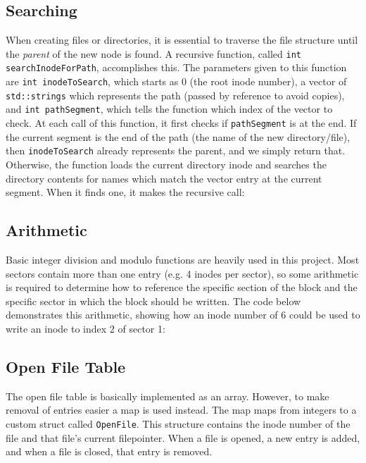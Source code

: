 \documentclass[]{article}
\begin{document}
\subsection{Searching}
When creating files or directories, it is essential to traverse the file structure until the \emph{parent} of the new node is found. A recursive function, called \texttt{int searchInodeForPath}, accomplishes this. The parameters given to this function are \texttt{int inodeToSearch}, which starts as 0 (the root inode number), a vector of \texttt{std::strings} which represents the path (passed by reference to avoid copies), and \texttt{int pathSegment}, which tells the function which index of the vector to check. At each call of this function, it first checks if \texttt{pathSegment} is at the end. If the current segment is the end of the path (the name of the new directory/file), then \texttt{inodeToSearch} already represents the parent, and we simply return that. Otherwise, the function loads the current directory inode and searches the directory contents for names which match the vector entry at the current segment. When it finds one, it makes the recursive call:


\subsection{Arithmetic}
Basic integer division and modulo functions are heavily used in this project. Most sectors contain more than one entry (e.g. 4 inodes per sector), so some arithmetic is required to determine how to reference the specific section of the block and the specific sector in which the block should be written. The code below demonstrates this arithmetic, showing how an inode number of 6 could be used to write an inode to index 2 of sector 1:


\subsection{Open File Table}
The open file table is basically implemented as an array. However, to make removal of entries easier a map is used instead. The map maps from integers to a custom struct called \texttt{OpenFile}. This structure contains the inode number of the file and that file's current filepointer. When a file is opened, a new entry is added, and when a file is closed, that entry is removed.
\end{document}
